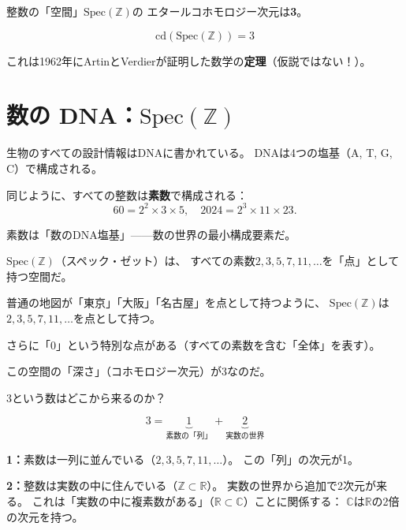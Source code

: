 \documentclass[12pt,a4paper]{article}
\begin{document}
\begin{keybox}
整数の「空間」$\mathrm{Spec}(\mathbb{Z})$の
エタールコホモロジー次元は\textbf{3}。

\[
  \mathrm{cd}(\mathrm{Spec}(\mathbb{Z})) = 3
\]

これは1962年にArtinとVerdierが証明した数学の\textbf{定理}（仮説ではない！）。
\end{keybox}

\section{数の DNA：$\mathrm{Spec}(\mathbb{Z})$}

\begin{ideabox}
生物のすべての設計情報はDNAに書かれている。
DNAは4つの塩基（A, T, G, C）で構成される。

同じように、すべての整数は\textbf{素数}で構成される：
\[
  60 = 2^2 \times 3 \times 5, \quad
  2024 = 2^3 \times 11 \times 23.
\]

素数は「数のDNA塩基」——数の世界の最小構成要素だ。
\end{ideabox}

\begin{mathbox}
$\mathrm{Spec}(\mathbb{Z})$（スペック・ゼット）は、
すべての素数$2, 3, 5, 7, 11, \ldots$を「点」として持つ空間だ。

普通の地図が「東京」「大阪」「名古屋」を点として持つように、
$\mathrm{Spec}(\mathbb{Z})$は$2, 3, 5, 7, 11, \ldots$を点として持つ。

さらに「0」という特別な点がある（すべての素数を含む「全体」を表す）。

この空間の「深さ」（コホモロジー次元）が$3$なのだ。
\end{mathbox}

$3$という数はどこから来るのか？

\begin{mathbox}[$3 = 1 + 2$ の分解]
\[
  3 = \underbrace{1}_{\text{素数の「列」}} + \underbrace{2}_{\text{実数の世界}}
\]

\textbf{1：}素数は一列に並んでいる（$2, 3, 5, 7, 11, \ldots$）。
この「列」の次元が1。

\textbf{2：}整数は実数の中に住んでいる（$\mathbb{Z}\subset\mathbb{R}$）。
実数の世界から追加で2次元が来る。
これは「実数の中に複素数がある」（$\mathbb{R}\subset\mathbb{C}$）ことに関係する：
$\mathbb{C}$は$\mathbb{R}$の2倍の次元を持つ。
\end{mathbox}
\end{document}
